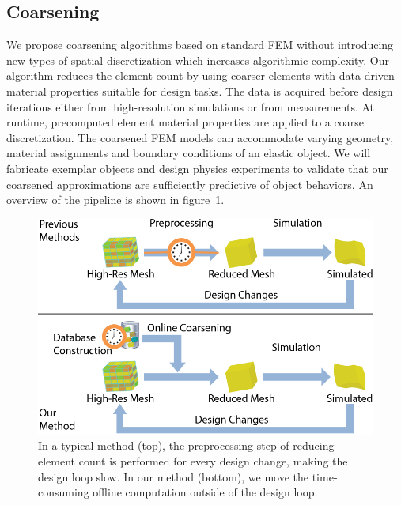 \subsection{Coarsening}
We propose coarsening algorithms based on standard FEM
without introducing new types of spatial discretization which increases
algorithmic complexity.
Our algorithm reduces the element count by using coarser elements with data-driven
material properties suitable for design tasks.
The data is acquired before design iterations either from high-resolution simulations or from measurements.
At runtime, precomputed element material properties are applied to a coarse discretization.
The coarsened FEM models can accommodate varying geometry,
material assignments and boundary conditions of an elastic object.
We will fabricate exemplar objects and design physics experiments to validate that our coarsened approximations are sufficiently predictive of object behaviors.
An overview of the pipeline is shown in figure~\ref{fig:overview}.
\begin{figure}[ht]
	\centering
	\includegraphics[width=0.7\columnwidth]{images/overview.png}
	\caption{
		In a typical method (top), the preprocessing step of reducing element count is performed for every design change, making the design loop slow.
		In our method (bottom), we move the time-consuming offline computation outside of the design loop.
	}
	\label{fig:overview}
\end{figure}
